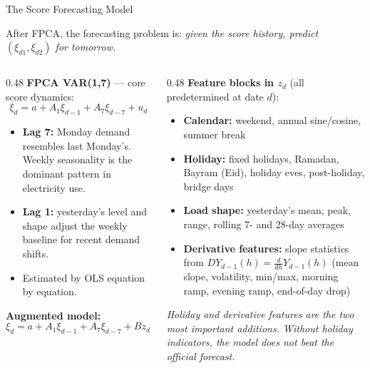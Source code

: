 \documentclass[10pt,aspectratio=169]{beamer}
\begin{document}

\begin{frame}{The Score Forecasting Model}

  After FPCA, the forecasting problem is:
  \textit{given the score history, predict $(\xi_{d1},\xi_{d2})$ for tomorrow.}

  \vspace{0.5em}
  \begin{columns}
  \begin{column}{0.48\textwidth}
    \textbf{FPCA VAR(1,7)} --- core score dynamics:
    \[
      \xi_d = a + A_1\xi_{d-1} + A_7\xi_{d-7} + u_d
    \]
    \begin{itemize}
      \item \textbf{Lag 7:} Monday demand resembles last Monday's.
        Weekly seasonality is the dominant pattern in electricity use.
      \item \textbf{Lag 1:} yesterday's level and shape adjust the
        weekly baseline for recent demand shifts.
      \item Estimated by OLS equation by equation.
    \end{itemize}

    \vspace{0.3em}
    \textbf{Augmented model:}
    \[
      \xi_d = a + A_1\xi_{d-1} + A_7\xi_{d-7} + Bz_d + u_d
    \]
  \end{column}
  \begin{column}{0.48\textwidth}
    \textbf{Feature blocks in $z_d$} (all predetermined at date $d$):
    \vspace{0.2em}
    \begin{itemize}
      \item \textbf{Calendar:} weekend, annual sine/cosine, summer break
      \item \textbf{Holiday:} fixed holidays, Ramadan, Bayram (Eid),
        holiday eves, post-holiday, bridge days
      \item \textbf{Load shape:} yesterday's mean, peak, range,
        rolling 7- and 28-day averages
      \item \textbf{Derivative features:} slope statistics from
        $DY_{d-1}(h) = \tfrac{d}{dh}Y_{d-1}(h)$
        (mean slope, volatility, min/max, morning ramp,
        evening ramp, end-of-day drop)
    \end{itemize}
    \vspace{0.3em}
    \textit{Holiday and derivative features are the two most important
    additions. Without holiday indicators, the model does not beat
    the official forecast.}
  \end{column}
  \end{columns}
\end{frame}
\end{document}
